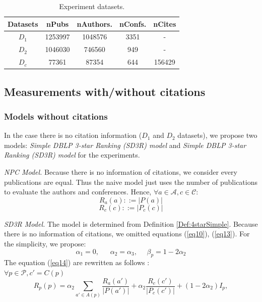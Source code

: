 \documentclass[10pt,leqno,twoside]{article}
\begin{document}
\begin{center}
\begin{table}
	\centering
	\caption{Experiment datasets.}
    \label{Tab:Dataset}
    \begin{tabular}{|c|c|c|c|c|}
    \hline
    \textbf{Datasets} & \textbf{nPubs} & \textbf{nAuthors. } & \textbf{nConfs.} & \textbf{nCites} \\ \hline
   $D_1$ & 1253997 & 1048576 & 3351 & - \\
   $D_2$ & 1046030 & 746560 & 949 & - \\
   $D_c$ & 77361 & 87354 & 644 & 156429 \\
    \hline
    \end{tabular}
\end{table}
\end{center}

\subsection{Measurements with/without citations}\label{Sect:Measure}
\subsubsection{Models without citations}
In the case there is no citation information ($D_1$ and $D_2$ datasets), we propose two models: \textit{Simple DBLP 3-star Ranking (SD3R) model} and \textit{Simple DBLP 3-star Ranking (SD3R) model} for the experiments.

\textit{NPC Model.} Because there is no information of citations, we consider every publications are equal. Thus the naive model just uses the number of publications to evaluate the authors and conferences.  Hence,
 $\forall a \in \mathcal{A}, c \in \mathcal{C}:$
\begin{equation}
R_a(a) ::= |P(a)|
\end{equation}
\begin{equation}
R_c(c) ::= |P_c(c)|
\end{equation}

\textit{SD3R Model.} The model is determined from Definition \ref{Def:4starSimple}.  Because there is no information of citations, we omitted equations (\ref{eq10}), (\ref{eq13}). For the simplicity,  we propose:
$$\alpha_1=0,~~~~~~~ \alpha_2=\alpha_3,~~~~~~  \beta_p = 1-2\alpha_2 $$
The equation (\ref{eq14}) are rewritten as follows :\\
$\forall p\in\mathcal{P}, c' = C(p)$\
\begin{equation}\label{eq15}
R_p(p) = \alpha_2\sum_{a'\in A(p)}\frac{R_a(a')}{|P(a')|} + \alpha_2\frac{R_c(c')}{|P_c(c')|} + (1-2\alpha_2)I_p,
\end{equation}
%
\end{document}
